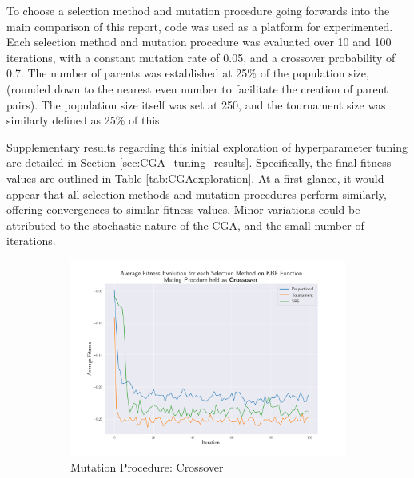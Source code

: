 \documentclass[10pt]{article}
\begin{document}
\begin{multicols}{2}
To choose a selection method and mutation procedure going forwards into the main comparison of this report, code %
was used as a platform for experimented. Each selection method and mutation procedure was evaluated over 10 and 100 iterations, with a constant mutation rate of 0.05, and a crossover probability of 0.7. The number of parents was established at 25\% of the population size, (rounded down to the nearest even number to facilitate the creation of parent pairs). The population size itself was set at 250, and the tournament size was similarly defined as 25\% of this.

Supplementary results regarding this initial exploration of hyperparameter tuning are detailed in Section \ref{sec:CGA_tuning_results}. Specifically, the final fitness values are outlined in Table \ref{tab:CGAexploration}. At a first glance, it would appear that all selection methods and mutation procedures perform similarly, offering convergences to similar fitness values. Minor variations could be attributed to the stochastic nature of the CGA, and the small number of iterations.
\vspace{-1mm}
\begin{figure}[H]
    \centering
    \begin{subfigure}{0.46\textwidth}
        \includegraphics[width=\textwidth]{../figures/Permanent Images/Fitness_Evolution_Crossover.png}
        \caption{Mutation Procedure: Crossover}
        \label{fig:CGA_fitness_evo_Crossover}
    \end{subfigure}
    \begin{subfigure}{0.46\textwidth}

\end{subfigure}
\end{figure}
\end{multicols}
\end{document}
